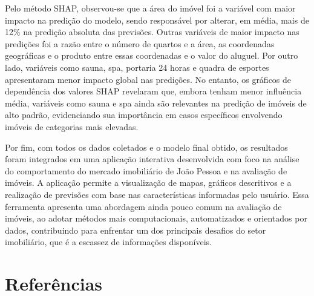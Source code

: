 \documentclass[
  12pt,
  a4paper,
]{scrreprt}
\begin{document}
\vspace{12pt}

Pelo método SHAP, observou-se que a área do imóvel foi a variável com
maior impacto na predição do modelo, sendo responsável por alterar, em
média, mais de 12\% na predição absoluta das previsões. Outras variáveis
de maior impacto nas predições foi a razão entre o número de quartos e a
área, as coordenadas geográficas e o produto entre essas coordenadas e o
valor do aluguel. Por outro lado, variáveis como sauna, spa, portaria 24
horas e quadra de esportes apresentaram menor impacto global nas
predições. No entanto, os gráficos de dependência dos valores SHAP
revelaram que, embora tenham menor influência média, variáveis como
sauna e spa ainda são relevantes na predição de imóveis de alto padrão,
evidenciando sua importância em casos específicos envolvendo imóveis de
categorias mais elevadas.

\vspace{12pt}

Por fim, com todos os dados coletados e o modelo final obtido, os
resultados foram integrados em uma aplicação interativa desenvolvida com
foco na análise do comportamento do mercado imobiliário de João Pessoa e
na avaliação de imóveis. A aplicação permite a visualização de mapas,
gráficos descritivos e a realização de previsões com base nas
características informadas pelo usuário. Essa ferramenta apresenta uma
abordagem ainda pouco comum na avaliação de imóveis, ao adotar métodos
mais computacionais, automatizados e orientados por dados, contribuindo
para enfrentar um dos principais desafios do setor imobiliário, que é a
escassez de informações disponíveis.

\chapter*{\texorpdfstring{\centering Referências}{Referências}}\label{referuxeancias}

\end{document}
